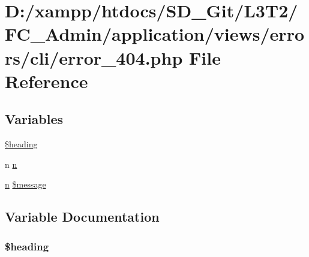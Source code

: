 \hypertarget{_admin_2application_2views_2errors_2cli_2error__404_8php}{}\section{D\+:/xampp/htdocs/\+S\+D\+\_\+\+Git/\+L3\+T2/\+F\+C\+\_\+\+Admin/application/views/errors/cli/error\+\_\+404.php File Reference}
\label{_admin_2application_2views_2errors_2cli_2error__404_8php}
\subsection*{Variables}
\begin{DoxyCompactItemize}
\item 
\hyperlink{_admin_2application_2views_2errors_2cli_2error__404_8php_a196169be7715d466e3310388b096598c}{\$heading}
\item 
n \hyperlink{_admin_2application_2views_2errors_2cli_2error__404_8php_ace0fd03cd383f20ce6ea63247a207294}{n}
\item 
\hyperlink{_admin_2application_2views_2errors_2cli_2error__general_8php_ace0fd03cd383f20ce6ea63247a207294}{n} \hyperlink{_admin_2application_2views_2errors_2cli_2error__404_8php_aaba2b6aee423b3b5e46000f90b4c8c7f}{\$message}
\end{DoxyCompactItemize}


\subsection{Variable Documentation}
\hypertarget{_admin_2application_2views_2errors_2cli_2error__404_8php_a196169be7715d466e3310388b096598c}{}
\subsubsection[{\$heading}]{\setlength{\rightskip}{0pt plus 5cm}\$heading}\label{_admin_2application_2views_2errors_2cli_2error__404_8php_a196169be7715d466e3310388b096598c}
\hypertarget{_admin_2application_2views_2errors_2cli_2error__404_8php_aaba2b6aee423b3b5e46000f90b4c8c7f}{}
